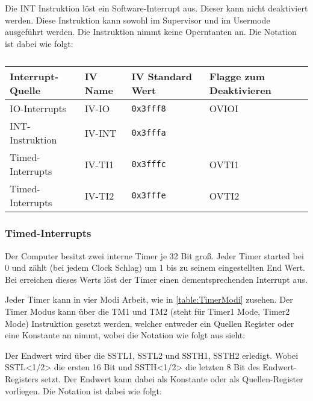 \documentclass{scrartcl}
\begin{document}
Die INT Instruktion löst ein Software-Interrupt aus.
Dieser kann nicht deaktiviert werden.
Diese Instruktion kann sowohl im Supervisor und im Usermode ausgeführt werden.
Die Instruktion nimmt keine Operntanten an.
Die Notation ist dabei wie folgt:


\begin{center}	
	\begin{table}[h]
		\caption{\label{table:iv}}
		\begin{tabular}{l | l l | l}
			Interrupt-Quelle & IV Name & IV Standard Wert & Flagge zum Deaktivieren \\
			\hline
			IO-Interrupts & IV-IO & \texttt{0x3fff8} & OVIOI \\
			INT-Instruktion & IV-INT & \texttt{0x3fffa} &  \\
			Timed-Interrupts & IV-TI1 & \texttt{0x3fffc} & OVTI1 \\
			Timed-Interrupts & IV-TI2 & \texttt{0x3fffe} & OVTI2
		\end{tabular}
	\end{table}
\end{center}

\subsubsection{Timed-Interrupts}

Der Computer besitzt zwei interne Timer je 32 Bit groß.
Jeder Timer started bei $0$ und zählt (bei jedem Clock Schlag) um $1$ bis zu seinem eingestellten End Wert.
Bei erreichen dieses Werts löst der Timer einen dementsprechenden Interrupt aus.

Jeder Timer kann in vier Modi Arbeit, wie in \autoref{table:TimerModi} zusehen.
Der Timer Modus kann über die TM1 und TM2 (steht für Timer1 Mode, Timer2 Mode) Instruktion gesetzt werden, welcher entweder ein Quellen Register oder eine Konstante an nimmt, wobei die Notation wie folgt aus sieht:


Der Endwert wird über die SSTL1, SSTL2 und SSTH1, SSTH2 erledigt.
Wobei SSTL<1/2> die ersten 16 Bit und SSTH<1/2> die letzten 8 Bit des Endwert-Registers setzt.
Der Endwert kann dabei als Konstante oder als Quellen-Register vorliegen.
Die Notation ist dabei wie folgt:


\end{document}
